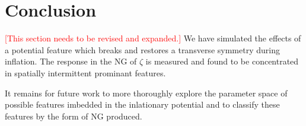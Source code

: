 
\section{Conclusion} \label{sec:conclusion}
\textcolor{red}{[This section needs to be revised and expanded.]}
We have simulated the effects of a potential feature which breaks and restores a transverse symmetry during inflation. 
The response in the NG of $\zeta$ is measured and found to be concentrated in spatially intermittent prominant features.

It remains for future work to more thoroughly explore the parameter space of possible features imbedded in the inlationary potential and to classify these features by the form of NG produced.
